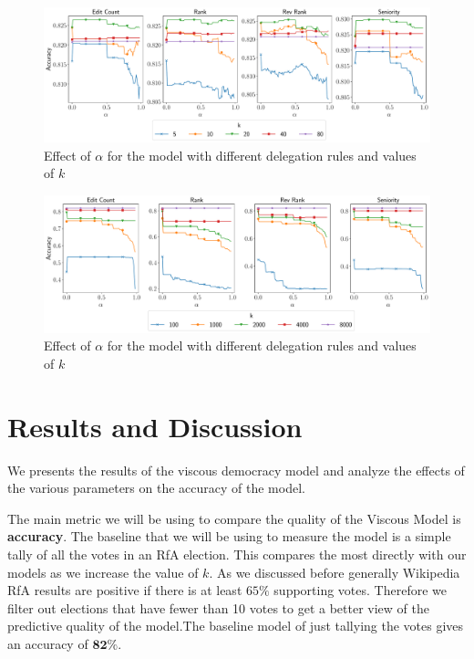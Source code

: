 \begin{figure}[t]
    \centering
    \includegraphics[width=\linewidth]{images/alpha_local.pdf}
    \caption{Effect of $\alpha$ for the \localv model with different delegation rules and values of $k$}
    \label{fig:local-alpha}
\end{figure}
\begin{figure}[t]
    \centering
    \includegraphics[width=\linewidth]{images/alpha_global.pdf}
    \caption{Effect of $\alpha$ for the \globalv model with different delegation rules and values of $k$}
    \label{fig:global-alpha}
\end{figure}

\section{Results and Discussion}

\label{sec:results}
We presents the results of the viscous democracy model and analyze the effects of the various parameters on the accuracy of the model.
\smallskip


The main metric we will be using to compare the quality of the Viscous Model is \textbf{accuracy}. The baseline that we will be using to measure the model is a simple tally of all the votes in an RfA election. This compares the most directly with our models as we increase the value of $k$. As we discussed before generally Wikipedia RfA results are positive if there is at least $65\%$ supporting votes. Therefore we filter out elections that have fewer than 10 votes to get a better view of the predictive quality of the model.The baseline model of just tallying the votes gives an accuracy of $\mathbf{82\%}$. 
\smallskip


